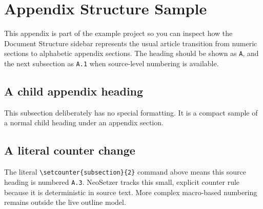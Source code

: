 
\section{Appendix Structure Sample}
\label{sec:appendix-structure}

This appendix is part of the example project so you can inspect how the
Document Structure sidebar represents the usual article transition from numeric
sections to alphabetic appendix sections. The heading should be shown as
\texttt{A}, and the next subsection as \texttt{A.1} when source-level numbering
is available.

\subsection{A child appendix heading}
\label{sec:appendix-structure:child}

This subsection deliberately has no special formatting. It is a compact sample
of a normal child heading under an appendix section.

\setcounter{subsection}{2}
\subsection{A literal counter change}
\label{sec:appendix-structure:counter}

The literal \texttt{\textbackslash setcounter\{subsection\}\{2\}} command
above means this source heading is numbered \texttt{A.3}. NeoSetzer tracks this
small, explicit counter rule because it is deterministic in source text. More
complex macro-based numbering remains outside the live outline model.
